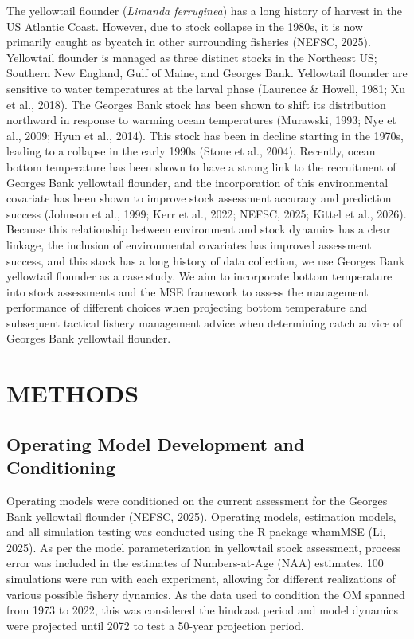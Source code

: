 \documentclass[
  12pt,
]{article}
\begin{document}
The yellowtail flounder (\emph{Limanda ferruginea}) has a long history of harvest in the US Atlantic Coast. However, due to stock collapse in the 1980s, it is now primarily caught as bycatch in other surrounding fisheries (NEFSC, 2025). Yellowtail flounder is managed as three distinct stocks in the Northeast US; Southern New England, Gulf of Maine, and Georges Bank. Yellowtail flounder are sensitive to water temperatures at the larval phase (Laurence \& Howell, 1981; Xu et al., 2018). The Georges Bank stock has been shown to shift its distribution northward in response to warming ocean temperatures (Murawski, 1993; Nye et al., 2009; Hyun et al., 2014). This stock has been in decline starting in the 1970s, leading to a collapse in the early 1990s (Stone et al., 2004). Recently, ocean bottom temperature has been shown to have a strong link to the recruitment of Georges Bank yellowtail flounder, and the incorporation of this environmental covariate has been shown to improve stock assessment accuracy and prediction success (Johnson et al., 1999; Kerr et al., 2022; NEFSC, 2025; Kittel et al., 2026). Because this relationship between environment and stock dynamics has a clear linkage, the inclusion of environmental covariates has improved assessment success, and this stock has a long history of data collection, we use Georges Bank yellowtail flounder as a case study. We aim to incorporate bottom temperature into stock assessments and the MSE framework to assess the management performance of different choices when projecting bottom temperature and subsequent tactical fishery management advice when determining catch advice of Georges Bank yellowtail flounder.

\section{METHODS}\label{methods}

\subsection{Operating Model Development and Conditioning}\label{operating-model-development-and-conditioning}

Operating models were conditioned on the current assessment for the Georges Bank yellowtail flounder (NEFSC, 2025). Operating models, estimation models, and all simulation testing was conducted using the R package whamMSE (Li, 2025). As per the model parameterization in yellowtail stock assessment, process error was included in the estimates of Numbers-at-Age (NAA) estimates. 100 simulations were run with each experiment, allowing for different realizations of various possible fishery dynamics. As the data used to condition the OM spanned from 1973 to 2022, this was considered the hindcast period and model dynamics were projected until 2072 to test a 50-year projection period.
\end{document}
